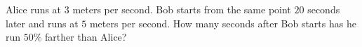 Alice runs at $3$ meters per second. Bob starts from the same point $20$ seconds later and runs at $5$ meters per second. How many seconds after Bob starts has he run $50\%$ farther than Alice?
